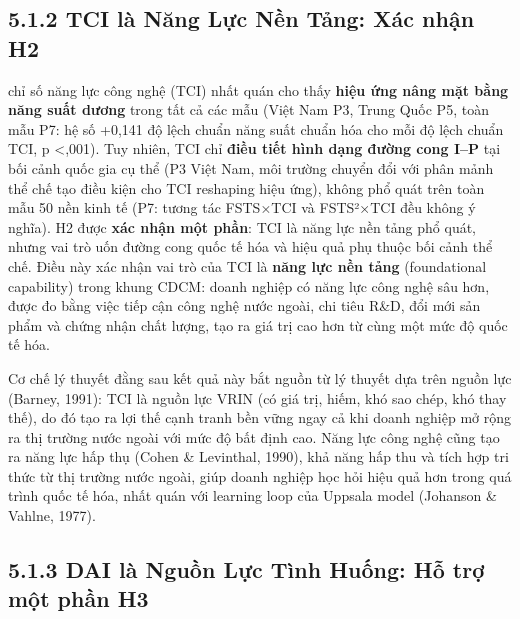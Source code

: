 \documentclass[
  a4paper,
  13pt]{extreport}
\begin{document}
\hypertarget{tci-luxe0-nux103ng-lux1ef1c-nux1ec1n-tux1ea3ng-xuxe1c-nhux1eadn-h2}{%
\subsection{5.1.2 TCI là Năng Lực Nền Tảng: Xác nhận
H2}\label{tci-luxe0-nux103ng-lux1ef1c-nux1ec1n-tux1ea3ng-xuxe1c-nhux1eadn-h2}}

chỉ số năng lực công nghệ (TCI) nhất quán cho thấy \textbf{hiệu ứng nâng
mặt bằng năng suất dương} trong tất cả các mẫu (Việt Nam P3, Trung Quốc
P5, toàn mẫu P7: hệ số +0,141 độ lệch chuẩn năng suất chuẩn hóa cho mỗi
độ lệch chuẩn TCI, p \textless,001). Tuy nhiên, TCI chỉ \textbf{điều
tiết hình dạng đường cong I--P} tại bối cảnh quốc gia cụ thể (P3 Việt
Nam, môi trường chuyển đổi với phân mảnh thể chế tạo điều kiện cho TCI
reshaping hiệu ứng), không phổ quát trên toàn mẫu 50 nền kinh tế (P7:
tương tác FSTS×TCI và FSTS²×TCI đều không ý nghĩa). H2 được \textbf{xác
nhận một phần}: TCI là năng lực nền tảng phổ quát, nhưng vai trò uốn
đường cong quốc tế hóa và hiệu quả phụ thuộc bối cảnh thể chế. Điều này
xác nhận vai trò của TCI là \textbf{năng lực nền tảng} (foundational
capability) trong khung CDCM: doanh nghiệp có năng lực công nghệ sâu
hơn, được đo bằng việc tiếp cận công nghệ nước ngoài, chi tiêu R\&D, đổi
mới sản phẩm và chứng nhận chất lượng, tạo ra giá trị cao hơn từ cùng
một mức độ quốc tế hóa.

Cơ chế lý thuyết đằng sau kết quả này bắt nguồn từ lý thuyết dựa trên
nguồn lực (Barney, 1991): TCI là nguồn lực VRIN (có giá trị, hiếm, khó
sao chép, khó thay thế), do đó tạo ra lợi thế cạnh tranh bền vững ngay
cả khi doanh nghiệp mở rộng ra thị trường nước ngoài với mức độ bất định
cao. Năng lực công nghệ cũng tạo ra năng lực hấp thụ (Cohen \&
Levinthal, 1990), khả năng hấp thu và tích hợp tri thức từ thị trường
nước ngoài, giúp doanh nghiệp học hỏi hiệu quả hơn trong quá trình quốc
tế hóa, nhất quán với learning loop của Uppsala model (Johanson \&
Vahlne, 1977).

\hypertarget{dai-luxe0-nguux1ed3n-lux1ef1c-tuxecnh-huux1ed1ng-hux1ed7-trux1ee3-mux1ed9t-phux1ea7n-h3}{%
\subsection{5.1.3 DAI là Nguồn Lực Tình Huống: Hỗ trợ một phần
H3}\label{dai-luxe0-nguux1ed3n-lux1ef1c-tuxecnh-huux1ed1ng-hux1ed7-trux1ee3-mux1ed9t-phux1ea7n-h3}}
\end{document}
